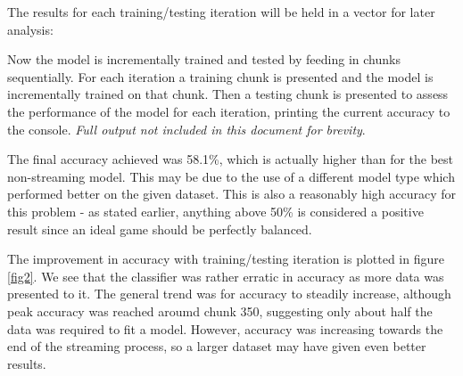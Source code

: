 \documentclass[10pt]{article}
\begin{document}
The results for each training/testing iteration will be held in a vector for later analysis:
\begin{Schunk}
\end{Schunk}
Now the model is incrementally trained and tested by feeding in chunks sequentially. For each iteration a training chunk is presented and the model is incrementally trained on that chunk. Then a testing chunk is presented to assess the performance of the model for each iteration, printing the current accuracy to the console. \textit{Full output not included in this document for brevity}.

\begin{Schunk}
\end{Schunk}

The final accuracy achieved was 58.1\%, which is actually higher than for the best non-streaming model. This may be due to the use of a different model type which performed better on the given dataset. This is also a reasonably high accuracy for this problem - as stated earlier, anything above 50\% is considered a positive result since an ideal game should be perfectly balanced.

The improvement in accuracy with training/testing iteration is plotted in figure \ref{fig2}. We see that the classifier was rather erratic in accuracy as more data was presented to it. The general trend was for accuracy to steadily increase, although peak accuracy was reached aroumd chunk 350, suggesting only about half the data was required to fit a model. However, accuracy was increasing towards the end of the streaming process, so a larger dataset may have given even better results.
\end{document}
